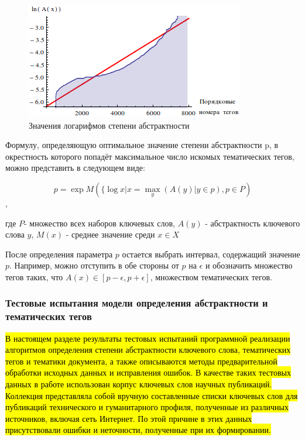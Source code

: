 \begin{figure}[ht]
  \begin{minipage}[ht]{1.0\linewidth}\centering
    \includegraphics[width=0.5\linewidth]{Dissertation/pics/abstract_words_2}
    \caption{Значения логарифмов степени абстрактности}
  \end{minipage}
  \label{img:abst_2}
\end{figure}


Формулу, определяющую оптимальное значение степени абстрактности p, в окрестность которого попадёт максимальное число искомых тематических тегов, можно представить в следующем виде:

$$p=\exp{M(\{\log{x}|x = \underset{y}\max{(A(y)|y\in p), p \in P})}$$,

где $P$- множество всех наборов ключевых слов, $A(y)$ - абстрактность ключевого слова $y$, $M(x)$ - среднее значение среди $x \in X$

После определения параметра $p$ остается выбрать интервал, содержащий значение $p$.  Например, можно отступить в обе стороны от $p$ на $\epsilon$ и обозначить множество тегов таких, что $A(x) \in [p − \epsilon,p + \epsilon]$, множеством тематических тегов.

\subsubsection{Тестовые испытания модели определения абстрактности и тематических тегов} \label{abstr_test}

\hl{В настоящем разделе результаты тестовых испытаний программной реализации алгоритмов определения степени абстрактности ключевого слова, тематических тегов и тематики документа, а также описываются методы предварительной обработки исходных данных и исправления ошибок.  В качестве таких тестовых данных в работе использован корпус ключевых слов научных публикаций. Коллекция представляла собой вручную составленные списки ключевых слов для публикаций технического и гуманитарного профиля, полученные из различных источников, включая сеть Интернет. По этой причине в этих данных присутствовали ошибки и неточности, полученные при их формировании.}

